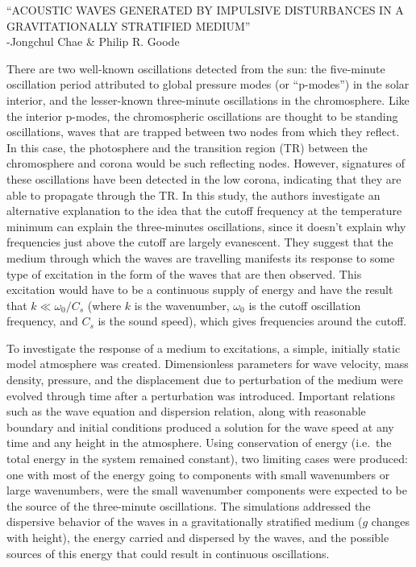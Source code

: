 \documentclass[12pt]{article}
\begin{document}
\begin{center}
    ``ACOUSTIC WAVES GENERATED BY IMPULSIVE DISTURBANCES IN A
    GRAVITATIONALLY STRATIFIED MEDIUM''\\
    -Jongchul Chae \& Philip R. Goode
\end{center}


There are two well-known oscillations detected from the sun: the five-minute
oscillation period attributed to global pressure modes (or ``p-modes'')
in the solar interior, and the
lesser-known three-minute oscillations in the chromosphere.
Like the interior p-modes, the chromospheric oscillations are thought to
be standing oscillations, waves that are trapped between two nodes from which
they reflect.
In this case, the photosphere and the transition region (TR) between the
chromosphere and corona would be such reflecting nodes. However, signatures
of these oscillations have been detected in the low corona, indicating that
they are able to propagate through the TR\@.
In this study, the authors
investigate an alternative explanation to the idea that the cutoff frequency
at the temperature minimum can explain the three-minutes oscillations, since
it doesn't explain why
frequencies just above the cutoff are largely evanescent.
They suggest that the medium through which the waves are
travelling manifests its response to some type of excitation
in the form of the waves that are then observed. This excitation would have
to be a continuous supply of energy and have the result that
$k \ll \omega_{0}/C_{s}$ (where $k$ is the wavenumber, $\omega_0$ is the cutoff
oscillation frequency, and $C_s$ is the sound speed), which gives frequencies around
the cutoff.

To investigate the response of a medium to excitations, a simple,
initially static model atmosphere was created.
Dimensionless parameters for wave velocity,
mass density, pressure, and the displacement due to perturbation
of the medium were evolved through time after a perturbation was
introduced.
Important relations such as the wave equation and
dispersion relation, along with reasonable boundary and initial
conditions produced a solution for the wave speed at any time and
any height in the atmosphere. Using conservation of energy
(i.e.\ the total energy in the system remained constant),
two limiting cases were produced: one with most of the energy
going to components with small wavenumbers or large wavenumbers,
were the small wavenumber components were expected to be the source
of the three-minute oscillations.
The simulations addressed the dispersive behavior of the waves in
a gravitationally stratified medium ($g$ changes with height),
the energy carried and dispersed by the waves, and 
the possible sources of this
energy that could result in continuous oscillations.
\end{document}
